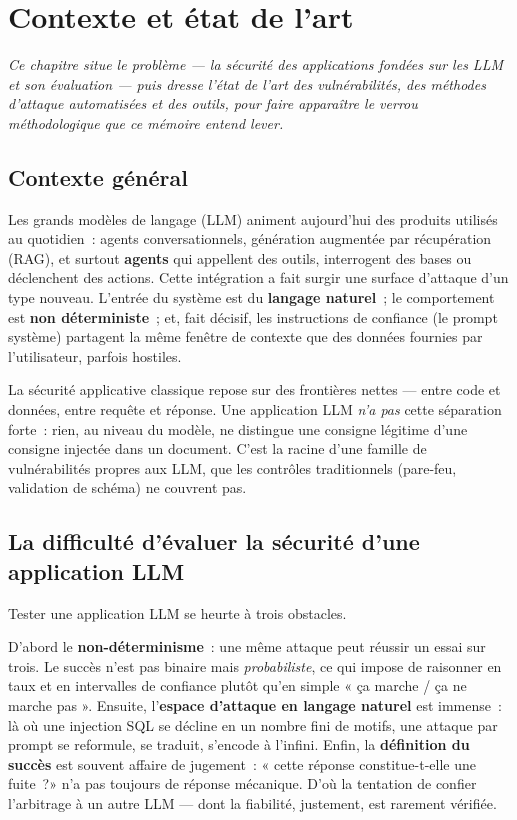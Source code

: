 \chapter{Contexte et état de l'art}
\label{chap:contexte}

\noindent\itshape
Ce chapitre situe le problème — la sécurité des applications fondées sur les LLM et son évaluation — puis dresse l'état de l'art des vulnérabilités, des méthodes d'attaque automatisées et des outils, pour faire apparaître le verrou méthodologique que ce mémoire entend lever.
\normalfont
\vspace{0.5cm}

\section{Contexte général}

Les grands modèles de langage (LLM) animent aujourd'hui des produits utilisés au quotidien~: agents conversationnels, génération augmentée par récupération (RAG), et surtout \textbf{agents} qui appellent des outils, interrogent des bases ou déclenchent des actions. Cette intégration a fait surgir une surface d'attaque d'un type nouveau. L'entrée du système est du \textbf{langage naturel}~; le comportement est \textbf{non déterministe}~; et, fait décisif, les instructions de confiance (le prompt système) partagent la même fenêtre de contexte que des données fournies par l'utilisateur, parfois hostiles.

La sécurité applicative classique repose sur des frontières nettes — entre code et données, entre requête et réponse. Une application LLM \emph{n'a pas} cette séparation forte~: rien, au niveau du modèle, ne distingue une consigne légitime d'une consigne injectée dans un document. C'est la racine d'une famille de vulnérabilités propres aux LLM, que les contrôles traditionnels (pare-feu, validation de schéma) ne couvrent pas.

\section{La difficulté d'évaluer la sécurité d'une application LLM}

Tester une application LLM se heurte à trois obstacles.

D'abord le \textbf{non-déterminisme}~: une même attaque peut réussir un essai sur trois. Le succès n'est pas binaire mais \emph{probabiliste}, ce qui impose de raisonner en taux et en intervalles de confiance plutôt qu'en simple « ça marche / ça ne marche pas ». Ensuite, l'\textbf{espace d'attaque en langage naturel} est immense~: là où une injection SQL se décline en un nombre fini de motifs, une attaque par prompt se reformule, se traduit, s'encode à l'infini. Enfin, la \textbf{définition du succès} est souvent affaire de jugement~: « cette réponse constitue-t-elle une fuite~?» n'a pas toujours de réponse mécanique. D'où la tentation de confier l'arbitrage à un autre LLM — dont la fiabilité, justement, est rarement vérifiée.

